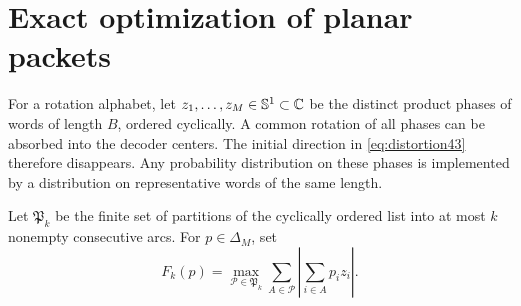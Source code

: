 \section{Exact optimization of planar packets}\label{sec:circle}
For a rotation alphabet, let $z_1,\ldots,z_M\in\mathbb S^1\subset\mathbb C$ be the distinct product phases of words of length $B$, ordered cyclically. A common rotation of all phases can be absorbed into the decoder centers. The initial direction in \eqref{eq:distortion43} therefore disappears. Any probability distribution on these phases is implemented by a distribution on representative words of the same length.

Let $\mathfrak P_k$ be the finite set of partitions of the cyclically ordered list into at most $k$ nonempty consecutive arcs. For $p\in\Delta_M$, set
\begin{equation}\label{eq:partition-value}
 F_k(p)=\max_{\mathcal P\in\mathfrak P_k}
                \sum_{A\in\mathcal P}\left|\sum_{i\in A}p_i z_i\right|.
\end{equation}

